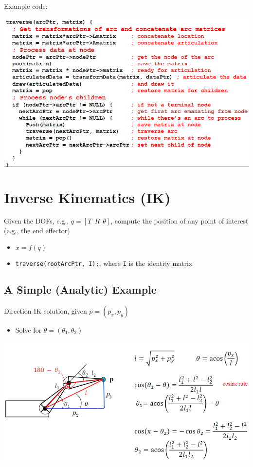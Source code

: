 \documentclass{article}
\begin{document}
Example code:
\begin{center}
    \includegraphics*[scale=0.9]{W7_13.png}
\end{center}

\section*{Inverse Kinematics (IK)}
Given the DOFs, e.g., $q = [T\:\: R\:\: \theta]$, compute the position of any point of interest (e.g., the end effector)
\begin{itemize}
    \item $x = f(q)$
    \item \texttt{traverse(rootArcPtr, I);}, where \texttt{I} is the identity matrix
\end{itemize}

\subsection*{A Simple (Analytic) Example}
Direction IK solution, given $p = (p_x, p_y)$
\begin{itemize}
    \item Solve for $\theta = (\theta_1, \theta_2)$
\end{itemize}
\begin{center}
    \includegraphics*[scale=0.6]{W7_14.png}
\end{center}
\end{document}
